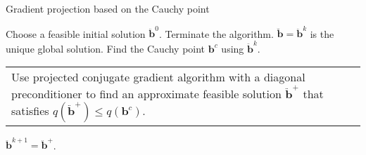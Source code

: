 \documentclass[11pt]{article}
\makeatletter
\newcommand{\0}{\phantom{0}}
\newcommand{\multiline}[1]{%
	\begin{tabularx}{\dimexpr\linewidth-\ALG@thistlm}[t]{@{}X@{}}
		#1
	\end{tabularx}
}
\makeatother
\begin{document}
%
%

\begin{algorithm}
	\caption{Gradient projection based on the Cauchy point}
	\label{alg:gradproj}
	\begin{spacing}{1.3}
		\begin{algorithmic}[1]
			\Require Choose a feasible initial solution $\ddot{\bm{b}}^{0}$.
			\State Terminate the algorithm. $\breve{\bm{b}} = \ddot{\bm{b}}^{k}$ is the unique global solution.
			\Else {}
			\State Find the Cauchy point $\bm{b}^{c}$ using $\ddot{\bm{b}}^{k}$.
			\State \multiline{Use projected conjugate gradient algorithm with a diagonal preconditioner to find an approximate feasible solution $\ddot{\bm{b}}^{+}$ that satisfies $q(\ddot{\bm{b}}^{+}) \leq q(\bm{b}^{c})$.}
			\State $\ddot{\bm{b}}^{k+1} = \ddot{\bm{b}}^{+}$.
			\EndIf
			\EndFor
		\end{algorithmic}
	\end{spacing}
\end{algorithm}
\end{document}
